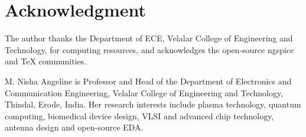 \documentclass[journal]{IEEEtran}
\begin{document}
\section*{Acknowledgment}
The author thanks the Department of ECE, Velalar College of Engineering and Technology, for computing resources, and acknowledges the open-source ngspice and TeX communities.




\begin{IEEEbiographynophoto}{M. Nisha Angeline}
is Professor and Head of the Department of Electronics and Communication Engineering, Velalar College of Engineering and Technology, Thindal, Erode, India. Her research interests include plasma technology, quantum computing, biomedical device design, VLSI and advanced chip technology, antenna design and open-source EDA.
\end{IEEEbiographynophoto}
\end{document}
